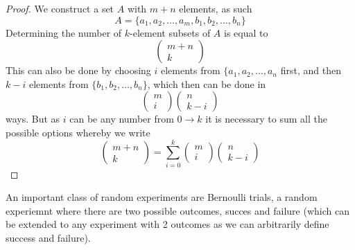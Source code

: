 \begin{proof}
  We construct a set $A$ with $m+n$ elements, as such
  \[
      A=\{a_{1},a_{2},\ldots,a_{m},b_{1},b_{2},\ldots,b_{n}\}
  \]
  Determining the number of $k$-element subsets of $A$ is equal to
  \[
      \begin{pmatrix}m+n\\k\end{pmatrix}
  \]
  This can also be done by choosing $i$ elements from $\{a_{1},a_{2},\ldots,a_{n}$ first, and then $k-i$ elements from $\{b_{1},b_{2},\ldots,b_{n}\}$, which then can be done in
  \[
      \begin{pmatrix}m\\i\end{pmatrix}\begin{pmatrix}n\\k-i\end{pmatrix}
  \]
  ways. But as $i$ can be any number from $0\rightarrow k$ it is necessary to sum all the possible options whereby we write
  \[
      \begin{pmatrix}m+n\\k\end{pmatrix}=\sum_{i=0}^{k}\begin{pmatrix}m\\i\end{pmatrix}\begin{pmatrix}n\\k-i\end{pmatrix}
  \]
\end{proof}
An important class of random experiments are Bernoulli trials, a random experiemnt where there are two possible outcomes, succes and failure (which can be extended to any experiment with 2 outcomes as we can arbitrarily define success and failure).

